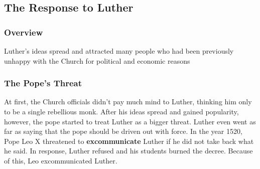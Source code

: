 \documentclass[11pt]{article}
\begin{document}
\subsection{The Response to Luther}
\label{sec:org1ce8bcd}
\subsubsection{Overview}
\label{sec:org207d58b}
Luther's ideas spread and attracted many people who had been previously unhappy with the Church for political and economic reasons
\subsubsection{The Pope's Threat}
\label{sec:orgdc9651d}
At first, the Church officials didn't pay much mind to Luther, thinking him only to be a single rebellious monk. After his ideas spread and gained popularity, however, the pope started to treat Luther as a bigger threat. Luther even went as far as saying that the pope should be driven out with force. In the year 1520, Pope Leo X threatened to \textbf{excommunicate} Luther if he did not take back what he said. In response, Luther refused and his students burned the decree. Because of this, Leo excommunicated Luther.
\end{document}
